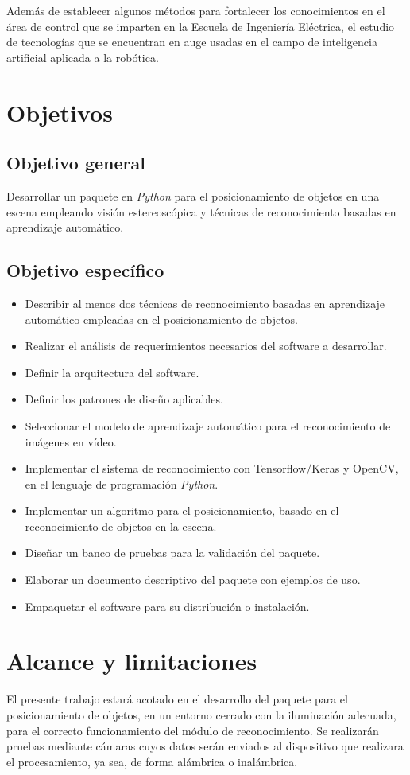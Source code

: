 Además de establecer algunos métodos para fortalecer los conocimientos en el área de control que se imparten en la Escuela de Ingeniería Eléctrica, el estudio de tecnologías que se encuentran en auge usadas en el campo de inteligencia artificial aplicada a la robótica. 
\section{Objetivos}
\subsection{Objetivo general}
Desarrollar un paquete en \textit{Python} para el posicionamiento de objetos en una escena empleando visión estereoscópica y técnicas de reconocimiento basadas en aprendizaje automático.
\subsection{Objetivo específico}
\begin{itemize}
    \item Describir al menos dos técnicas de reconocimiento basadas en aprendizaje automático empleadas en el posicionamiento de objetos.
    \item Realizar el análisis de requerimientos necesarios del software a desarrollar.
    \item Definir la arquitectura del software.
    \item Definir los patrones de diseño aplicables.
    \item Seleccionar el modelo de aprendizaje automático para el reconocimiento de imágenes en vídeo.
    \item Implementar el sistema de reconocimiento con Tensorflow/Keras y OpenCV, en el lenguaje de programación \textit{Python}.
    \item Implementar un algoritmo para el posicionamiento, basado en el reconocimiento de objetos en la escena.
    \item Diseñar un banco de pruebas para la validación del paquete.
    \item Elaborar un documento descriptivo del paquete con ejemplos de uso.
    \item Empaquetar el software para su distribución o instalación.
\end{itemize}
\section{Alcance y limitaciones}
El presente trabajo estará acotado en el desarrollo del paquete para el posicionamiento de objetos, en un entorno cerrado con la iluminación adecuada, para el correcto funcionamiento del módulo de reconocimiento. Se realizarán pruebas mediante cámaras cuyos datos serán enviados al dispositivo que realizara el procesamiento, ya sea, de forma alámbrica o inalámbrica.
